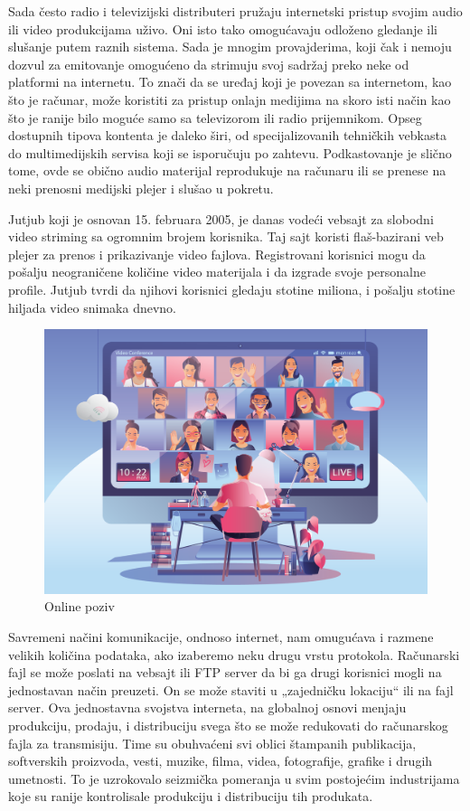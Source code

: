 \documentclass[12pt]{article}
\begin{document}
    Sada često radio i televizijski distributeri pružaju internetski pristup svojim audio ili video produkcijama uživo. Oni isto tako omogućavaju odloženo gledanje ili slušanje putem raznih sistema. Sada je mnogim provajderima, koji čak i nemoju dozvul za emitovanje omogućeno da strimuju svoj sadržaj preko neke od platformi na internetu. To znači da se uređaj koji je povezan sa internetom, kao što je računar, može koristiti za pristup onlajn medijima na skoro isti način kao što je ranije bilo moguće samo sa televizorom ili radio prijemnikom. Opseg dostupnih tipova kontenta je daleko širi, od specijalizovanih tehničkih vebkasta do multimedijskih servisa koji se isporučuju po zahtevu. Podkastovanje je slično tome, ovde se obično audio materijal reprodukuje na računaru ili se prenese na neki prenosni medijski plejer i slušao u pokretu. 
    
	Jutjub koji je osnovan 15. februara 2005, je danas vodeći vebsajt za slobodni video striming sa ogromnim brojem korisnika. Taj sajt koristi flaš-bazirani veb plejer za prenos i prikazivanje video fajlova. Registrovani korisnici mogu da pošalju neograničene količine video materijala i da izgrade svoje personalne profile. Jutjub tvrdi da njihovi korisnici gledaju stotine miliona, i pošalju stotine hiljada video snimaka dnevno.

\begin{figure}
    \centering
    \includegraphics[scale=0.2]{poziv.png}
    \caption{Online poziv}
\end{figure}

	Savremeni načini komunikacije, ondnoso internet, nam omugućava i razmene velikih količina podataka, ako izaberemo neku drugu vrstu protokola. Računarski fajl se može poslati na vebsajt ili FTP server da bi ga drugi korisnici mogli na jednostavan način preuzeti. On se može staviti u „zajedničku lokaciju“ ili na fajl server.  Ova jednostavna svojstva interneta, na globalnoj osnovi menjaju produkciju, prodaju, i distribuciju svega što se može redukovati do računarskog fajla za transmisiju. Time su obuhvaćeni svi oblici štampanih publikacija, softverskih proizvoda, vesti, muzike, filma, videa, fotografije, grafike i drugih umetnosti. To je uzrokovalo seizmička pomeranja u svim postojećim industrijama koje su ranije kontrolisale produkciju i distribuciju tih produkata.
\end{document}
